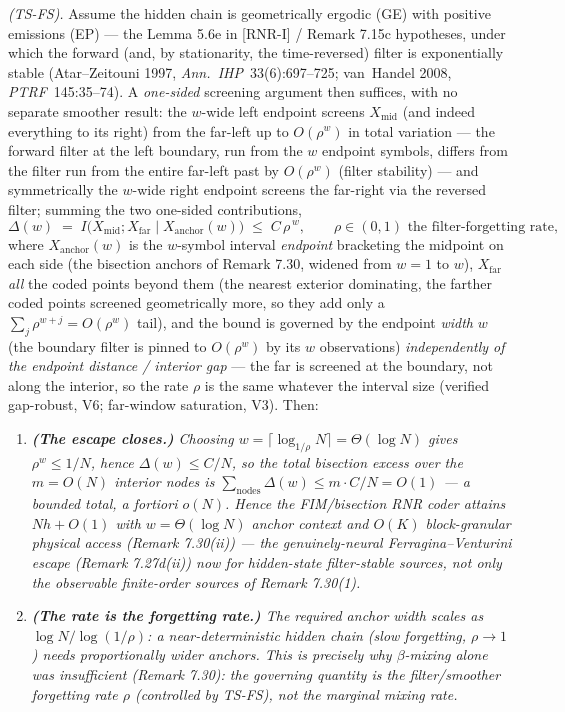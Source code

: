 \documentclass[
]{article}
\begin{document}
\emph{(TS-FS).} Assume the hidden chain is geometrically ergodic \textnormal{(GE)}
with positive emissions \textnormal{(EP)} --- the Lemma 5.6e in [RNR-I] / Remark 7.15c hypotheses,
under which the forward (and, by stationarity, the time-reversed) filter is
exponentially stable (Atar--Zeitouni 1997, \emph{Ann.\ IHP}\ 33(6):697--725; van~Handel
2008, \emph{PTRF}\ 145:35--74). A \emph{one-sided} screening argument then suffices, with
no separate smoother result: the $w$-wide left endpoint screens $X_{\mathrm{mid}}$ (and
indeed everything to its right) from the far-left up to $O(\rho^w)$ in total variation ---
the forward filter at the left boundary, run from the $w$ endpoint symbols, differs from
the filter run from the entire far-left past by $O(\rho^w)$ (filter stability) --- and
symmetrically the $w$-wide right endpoint screens the far-right via the reversed filter;
summing the two one-sided contributions,
\[
  \Delta(w)\;=\;I\bigl(X_{\mathrm{mid}};X_{\mathrm{far}}\mid X_{\mathrm{anchor}}(w)\bigr)
  \;\le\;C\,\rho^{\,w},\qquad \rho\in(0,1)\text{ the filter-forgetting rate,}
\]
where $X_{\mathrm{anchor}}(w)$ is the $w$-symbol interval \emph{endpoint} bracketing the
midpoint on each side (the bisection anchors of Remark 7.30, widened from $w=1$ to $w$),
$X_{\mathrm{far}}$ \emph{all} the coded points beyond them (the nearest exterior
dominating, the farther coded points screened geometrically more, so they add only a
$\sum_j\rho^{w+j}=O(\rho^w)$ tail), and the bound is governed by the endpoint
\emph{width} $w$ (the boundary filter is pinned to $O(\rho^w)$ by its $w$ observations)
\emph{independently of the endpoint distance / interior gap} --- the far is screened at
the boundary, not along the interior, so the rate $\rho$ is the same whatever the
interval size (verified gap-robust, V6; far-window saturation, V3). Then:
\begin{enumerate}
\item \emph{\textbf{(The escape closes.)} Choosing $w=\lceil\log_{1/\rho}N\rceil=
\Theta(\log N)$ gives $\rho^w\le1/N$, hence $\Delta(w)\le C/N$, so the total bisection
excess over the $m=O(N)$ interior nodes is $\sum_{\mathrm{nodes}}\Delta(w)\le m\cdot C/N
=O(1)$ --- a bounded total, a fortiori $o(N)$. Hence the FIM/bisection RNR coder attains
$Nh+O(1)$ with $w=\Theta(\log N)$ anchor context and $O(K)$ block-granular physical
access (Remark 7.30(ii)) --- the genuinely-neural
Ferragina--Venturini escape (Remark 7.27d(ii)) now for \emph{hidden}-state
filter-stable sources, not only the observable finite-order sources of Remark 7.30(1).}
\item \emph{\textbf{(The rate is the forgetting rate.)} The required anchor width
scales as $\log N/\log(1/\rho)$: a near-deterministic hidden chain (slow forgetting,
$\rho\to1$) needs proportionally wider anchors. This is precisely why $\beta$-mixing
alone was insufficient (Remark 7.30): the governing quantity is the filter/smoother
forgetting rate $\rho$ (controlled by TS-FS), not the marginal mixing rate.}
\end{enumerate}
\end{document}
